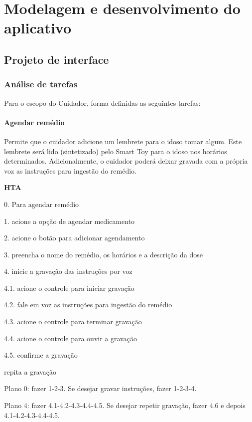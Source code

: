 \chapter{Modelagem e desenvolvimento do aplicativo}

\lipsum[1] 

\section{Projeto de interface}

\subsection{Análise de tarefas}
Para o escopo do Cuidador, forma definidas as seguintes tarefas:
\subsubsection*{Agendar remédio}
Permite que o cuidador adicione um lembrete para o idoso tomar algum. Este lembrete será lido (sintetizado) pelo Smart Toy para o idoso nos horários determinados. Adicionalmente, o cuidador poderá deixar gravada com a própria voz as instruções para ingestão do remédio.

\begin{MyIndentedList}
\item \textbf{HTA}
\item 0. Para agendar remédio
    \begin{MyIndentedList}
        \item 1. acione a opção de agendar medicamento
        \item 2. acione o botão para adicionar agendamento
        \item 3. preencha o nome do remédio, os horários e a descrição da dose
        \item 4. inicie a gravação das instruções por voz
        \begin{MyIndentedList}
             \item 4.1. acione o controle para iniciar gravação
             \item 4.2. fale em voz as instruções para ingestão do remédio
             \item 4.3. acione o controle para terminar gravação
             \item 4.4. acione o controle para ouvir a gravação
             \item 4.5. confirme a gravação
             \item repita a gravação
         \end{MyIndentedList} 
    \end{MyIndentedList}
\item Plano 0: fazer 1-2-3. Se desejar gravar instruções, fazer 1-2-3-4. 
\item Plano 4: fazer 4.1-4.2-4.3-4.4-4.5. Se desejar repetir gravação, fazer 4.6 e depois 4.1-4.2-4.3-4.4-4.5. 
\end{MyIndentedList}


